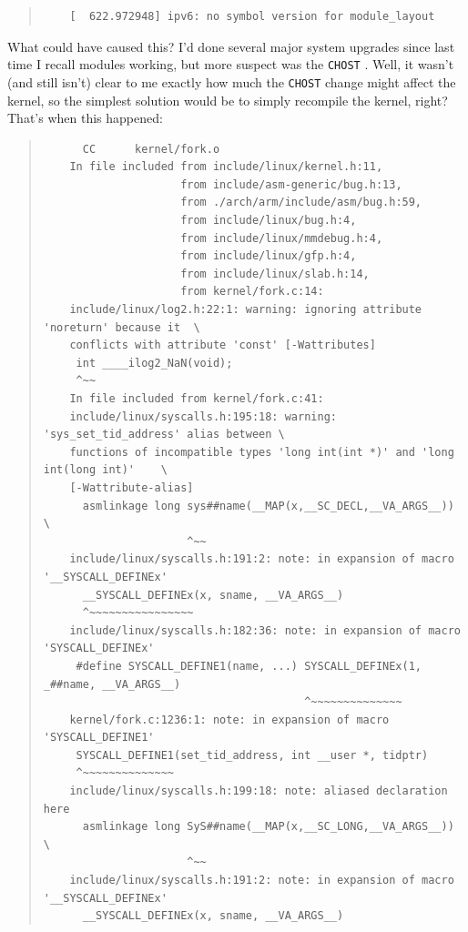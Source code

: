 \documentclass{article}
\begin{document}
\begin{quote}
\begin{verbatim}
	[  622.972948] ipv6: no symbol version for module_layout
\end{verbatim}
\end{quote}

What could have caused this?  I'd done several major system upgrades since last time I recall modules working, but more suspect was the \texttt{CHOST} .  Well, it wasn't (and still isn't) clear to me exactly how much the \texttt{CHOST} change might affect the kernel, so the simplest solution would be to simply recompile the kernel, right?  That's when this happened:

\begin{quote}
\begin{verbatim}
	  CC      kernel/fork.o
	In file included from include/linux/kernel.h:11,
	                 from include/asm-generic/bug.h:13,
	                 from ./arch/arm/include/asm/bug.h:59,
	                 from include/linux/bug.h:4,
	                 from include/linux/mmdebug.h:4,
	                 from include/linux/gfp.h:4,
	                 from include/linux/slab.h:14,
	                 from kernel/fork.c:14:
	include/linux/log2.h:22:1: warning: ignoring attribute 'noreturn' because it  \
	conflicts with attribute 'const' [-Wattributes]
	 int ____ilog2_NaN(void);
	 ^~~
	In file included from kernel/fork.c:41:
	include/linux/syscalls.h:195:18: warning: 'sys_set_tid_address' alias between \
	functions of incompatible types 'long int(int *)' and 'long int(long int)'    \
	[-Wattribute-alias]
	  asmlinkage long sys##name(__MAP(x,__SC_DECL,__VA_ARGS__)) \
	                  ^~~
	include/linux/syscalls.h:191:2: note: in expansion of macro '__SYSCALL_DEFINEx'
	  __SYSCALL_DEFINEx(x, sname, __VA_ARGS__)
	  ^~~~~~~~~~~~~~~~~
	include/linux/syscalls.h:182:36: note: in expansion of macro 'SYSCALL_DEFINEx'
	 #define SYSCALL_DEFINE1(name, ...) SYSCALL_DEFINEx(1, _##name, __VA_ARGS__)
	                                    ^~~~~~~~~~~~~~~
	kernel/fork.c:1236:1: note: in expansion of macro 'SYSCALL_DEFINE1'
	 SYSCALL_DEFINE1(set_tid_address, int __user *, tidptr)
	 ^~~~~~~~~~~~~~~
	include/linux/syscalls.h:199:18: note: aliased declaration here
	  asmlinkage long SyS##name(__MAP(x,__SC_LONG,__VA_ARGS__)) \
	                  ^~~
	include/linux/syscalls.h:191:2: note: in expansion of macro '__SYSCALL_DEFINEx'
	  __SYSCALL_DEFINEx(x, sname, __VA_ARGS__)

\end{verbatim}
\end{quote}
\end{document}
